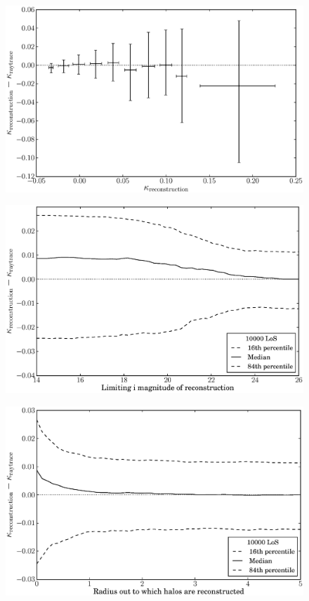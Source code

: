 \documentclass[useAMS,usenatbib]{mn2e}
\begin{document}
\begin{figure}\label{fig:isitbiased}
\includegraphics[width=\columnwidth]{isitbiased.eps}
\caption[Biased?]{}
\end{figure}
\begin{figure}\label{fig:magcut}
\includegraphics[width=\columnwidth]{mag_scatter.eps}
\caption[magcut]{}
\end{figure}
\begin{figure}\label{fig:radcut}
\includegraphics[width=\columnwidth]{radius_scatter.eps}
\caption[radius cut]{}
\end{figure}
\end{document}
